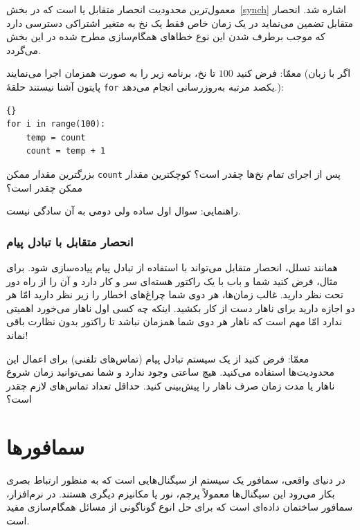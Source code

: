 \documentclass{book}
\newcommand{\clearemptydoublepage}{\newpage\cleardoublepage}
\begin{document}
    معمول‌ترین محدودیت انحصار متقابل یا  است که 
    در بخش~\ref{synch}  اشاره شد. انحصار متقابل تضمین می‌نماید در یک زمان خاص  فقط یک نخ به متغیر اشتراکی دسترسی دارد 
    که موجب برطرف شدن این نوع خطاهای همگام‌سازی مطرح شده در این بخش می‌گردد. 
    
    معمّا: فرض کنید $100$ تا نخ، برنامه زیر را به صورت همزمان اجرا می‌نمایند (اگر با زبان پایتون آشنا نیستند حلقهٔ \texttt{for} یکصد مرتبه 
    به‌روزرسانی انجام می‌دهد.):

\begin{latin}
\begin{lstlisting}[]{}
for i in range(100):
    temp = count
    count = temp + 1
\end{lstlisting}
\end{latin}

    بزرگترین مقدار ممکن \texttt{count} پس از اجرای تمام نخ‌ها چقدر است؟ کوچکترین مقدار ممکن چقدر است؟ 
    

    راهنمایی: سوال اول ساده ولی دومی به آن سادگی نیست. 

\subsection {انحصار متقابل با تبادل پیام}


    همانند تسلل، انحصار متقابل می‌تواند با استفاده از تبادل پیام پیاده‌سازی شود. برای مثال، فرض کنید شما و باب 
    با یک راکتور هسته‌ای سر و کار دارد و آن را از راه دور تحت نظر دارید. غالب زمان‌ها، هر دوی شما چراغ‌های اخطار را زیر نظر دارید 
    امّا هر دو اجازه دارید برای ناهار  دست از کار بکشید. 
    اینکه چه کسی اول ناهار می‌خورد اهمیتی ندارد امّا مهم است که ناهار هر دوی شما همزمان نباشد تا راکتور بدون نظارت باقی نماند!

    معمّا: فرض کنید از یک سیستم تبادل پیام (تماس‌های تلفنی) برای اعمال این محدودیت‌ها استفاده می‌کنید. 
    هیچ ساعتی وجود ندارد و شما نمی‌توانید زمان شروع ناهار یا مدت زمان صرف ناهار را پیش‌بینی کنید. 
    حداقل تعداد تماس‌های لازم چقدر است؟
    
\clearemptydoublepage
\chapter{سمافورها}

    در دنیای واقعی، سمافور یک سیستم از سیگنال‌هایی است که به منظور ارتباط بصری بکار می‌رود این سیگنال‌ها معمولاً پرچم،‌ نور یا مکانیزم دیگری هستند. 
    در نرم‌افزار، سمافور ساختمان داده‌ای است که برای حل انوع گوناگونی از مسائل همگام‌سازی مفید است.
\end{document}
